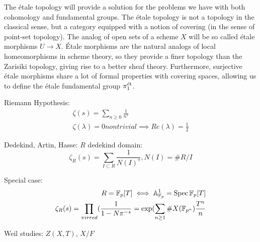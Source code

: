The \'etale topology will provide a solution for the problems we have with both cohomology and fundamental groups. The \'etale topology is not a topology in the classical sense, but a category equipped with a notion of covering (in the sense of point-set topology). The analog of open sets of a scheme $X$ will be so called \'etale morphisms $U \to X$. \'Etale morphisms are the natural analogs of local homeomorphisms in scheme theory, so they provide a finer topology than the Zarisiki topology, giving rise to a better sheaf theory. Furthermore, surjective \'etale morphisms share a lot of formal properties with covering spaces, allowing us to define the \'etale fundamental group $\pi_1^{\text{\'et}}$.



Riemann Hypothesis:
\begin{align}
	\zeta(s) = \sum_{n \ge 0} \frac{1}{n^s} \\
	\zeta(\lambda) = 0 nontrivial \implies Re(\lambda) = \frac{1}{2}
\end{align}

Dedekind, Artin, Hasse:
$R$ dedekind domain:
\[
	\zeta_R(s) = \sum_{I \subset R} \frac{1}{N(I)^s}, N(I) =\#R/I
\]

Special case:
\begin{align}
	R = \mathbb{F}_p[T] \iff \mathbb{A}_{\mathbb{F}_p}^1 = \operatorname{Spec}\mathbb{F}_p[T] \\
	\zeta_R(s) = \prod_{\pi irred}(\frac{1}{1-N\pi^{-s}} = \exp(\sum_{n \ge 1} \# X(\mathbb{F}_{p^n})\frac{T^n}{n}
\end{align}

Weil studies: $Z(X,T)$, $X/F$
